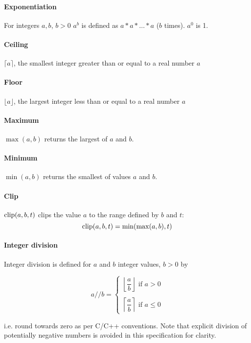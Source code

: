 \paragraph*{Exponentiation} For integers $a, b$, $b>0$ $a^b$ is defined as $a*a*\hdots *a$ ($b$ times). $a^0$ is 1.

\paragraph*{Ceiling} $\lceil a \rceil$, the smallest integer greater than or equal to a real number $a$

\paragraph*{Floor} $\lfloor a \rfloor$, the largest integer less than or equal to a real number $a$

\paragraph*{Maximum} $\max(a,b)$ returns the largest of $a$ and $b$.

\paragraph*{Minimum} $\min(a,b)$ returns the smallest of values $a$ and $b$.

\paragraph*{Clip} $\operatorname{clip}(a,b,t)$ clips the value $a$ to the range defined by $b$ and $t$:
\[\operatorname{clip}(a,b,t)=\min(\max(a,b),t)\]

\paragraph*{Integer division} Integer division is defined for $a$ and $b$ integer values, $b>0$ by

\[a//b= \left\{ 
\begin{array}{l} 
\left\lfloor \dfrac{a}{b} \right\rfloor \text{ if } a>0 \\
\\
\left\lceil \dfrac{a}{b} \right\rceil \text{ if } a\leq 0
\end{array} \right.
\]

i.e. round towards zero as per C/C++ conventions. Note that explicit division of potentially negative numbers
is avoided in this specification for clarity.

